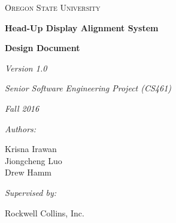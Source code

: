 \documentclass[letterpaper,10pt,onecolumn]{IEEEtran}
\def\name{Krisna Irawan\\ Jiongcheng Luo\\ Drew Hamm}
\def\doc{Design Document}
\def\version{Version 1.0}
\begin{document}
\begin{titlepage}
	\centering
	{\scshape\LARGE Oregon State University\par}
	\vspace{2cm}
	{\huge\bfseries Head-Up Display Alignment System\par}
	\vspace{1cm}
	{\Large\bfseries \doc\par}
	\vspace{1cm}
	{\large\itshape \version\par}
	\vspace{1cm}
	{\Large\itshape Senior Software Engineering Project (CS461)\par}
	{\Large\itshape Fall 2016\par}
	\vspace{1cm}
	{\normalsize\itshape Authors:\par}
	{\normalsize \name\par}
	\vspace{1cm}
	{\normalsize\itshape Supervised by:\par}
	{\normalsize Rockwell Collins, Inc.\par}
	\vspace{3cm}


	\begin{abstract}
		A Head-up Display (HUD) Alignment system is developed as a proof of concept aims to explore a potential technological innovation for the HUD system that presents critical flight information to pilots. The primary objective of this project is to reduce the cost and time required to precisely align flight information to the HUD by introducing an additional sensor component to the system to make the alignment process more dynamic. This document is intended for use by Rockwell Collins and their HUD system development team. This document provides and explains an overall system framework, design viewpoints and specific design description for each viewpoint within the system. 
	\end{abstract}
\end{titlepage}
\tableofcontents

\newpage






\newpage
\nocite{*}


\end{document}
